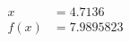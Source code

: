 \documentclass[preview]{standalone}
\begin{document}
\begin{align*}
x &= 4.7136\\f(x) &= 7.9895823
\end{align*}
\end{document}
